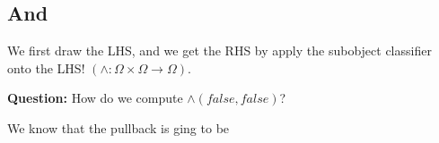 \documentclass[11pt]{book}
\DeclarePairedDelimiter{\ceil}{\lceil}{\rceil}
\begin{document}
\subsection{And}

We first draw the LHS, and we get the RHS by apply the subobject classifier
onto the LHS!  $(\land: \Omega \times \Omega \rightarrow \Omega)$. 


\textbf{Question:} How do we compute $\land(false, false)$?

We know that the pullback is ging to be
\end{document}
